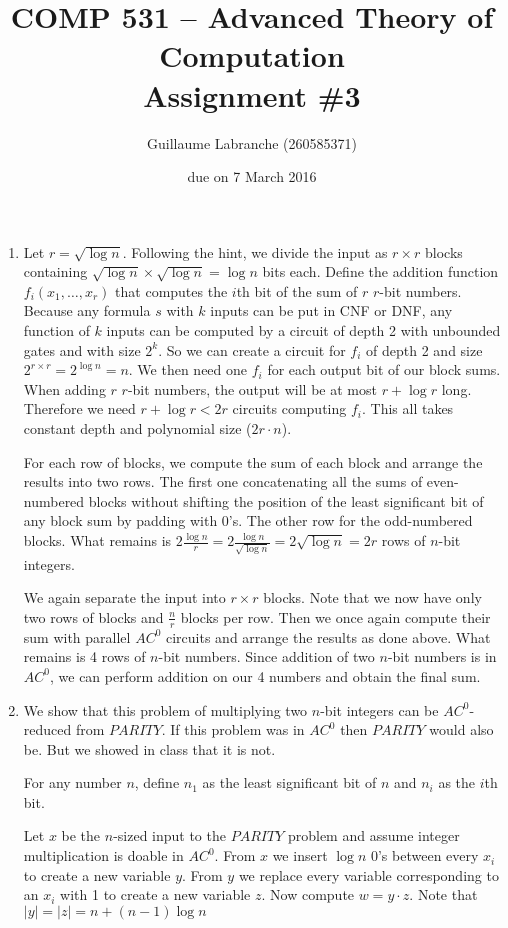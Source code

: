 \documentclass{article}
\author{Guillaume Labranche (260585371)}
\title{COMP 531 -- Advanced Theory of Computation\\Assignment \#3}
\date{due on 7 March 2016}
\begin{document}
\maketitle

\begin{enumerate}
\item Let $r=\sqrt{\log n}$. Following the hint, we divide the input as $r \times r$ blocks containing $\sqrt{\log n} \times \sqrt{\log n} = \log n$ bits each. 
Define the addition function $f_i(x_1,\dotsc,x_r)$ that computes the $i$th bit of the sum of $r$ $r$-bit numbers. Because any formula $s$ with $k$ inputs can be put in CNF or DNF, any function of $k$ inputs can be computed by a circuit of depth 2 with unbounded gates and with size $2^k$. So we can create a circuit for $f_i$ of depth 2 and size $2^{r \times r} = 2^{\log n} = n$. We then need one $f_i$ for each output bit of our block sums. When adding $r$ $r$-bit numbers, the output will be at most $r+\log r$ long. Therefore we need $r + \log r < 2r$ circuits computing $f_i$. This all takes constant depth and polynomial size ($2r \cdot n$).

For each row of blocks, we compute the sum of each block and arrange the results into two rows. The first one concatenating all the sums of even-numbered blocks without shifting the position of the least significant bit of any block sum by padding with 0's. The other row for the odd-numbered blocks. What remains is $2\frac{\log n}{r}=2\frac{\log n}{\sqrt{\log n}}=2\sqrt{\log n}=2r$ rows of $n$-bit integers.

We again separate the input into $r \times r$ blocks. Note that we now have only two rows of blocks and $\frac{n}{r}$ blocks per row. Then we once again compute their sum with parallel $AC^0$ circuits and arrange the results as done above. What remains is 4 rows of $n$-bit numbers. Since addition of two $n$-bit numbers is in $AC^0$, we can perform addition on our 4 numbers and obtain the final sum.

\newpage
\item We show that this problem of multiplying two $n$-bit integers can be $AC^0$-reduced from $PARITY$. If this problem was in $AC^0$ then $PARITY$ would also be. But we showed in class that it is not.

For any number $n$, define $n_1$ as the least significant bit of $n$ and $n_i$ as the $i$th bit.

Let $x$ be the $n$-sized input to the $PARITY$ problem and assume integer multiplication is doable in $AC^0$. From $x$ we insert $\log n$ 0's between every $x_i$ to create a new variable $y$. From $y$ we replace every variable corresponding to an $x_i$ with 1 to create a new variable $z$. Now compute $w=y \cdot z$. Note that $|y|=|z|=n+(n-1)\log n$


\end{enumerate}
\end{document}
